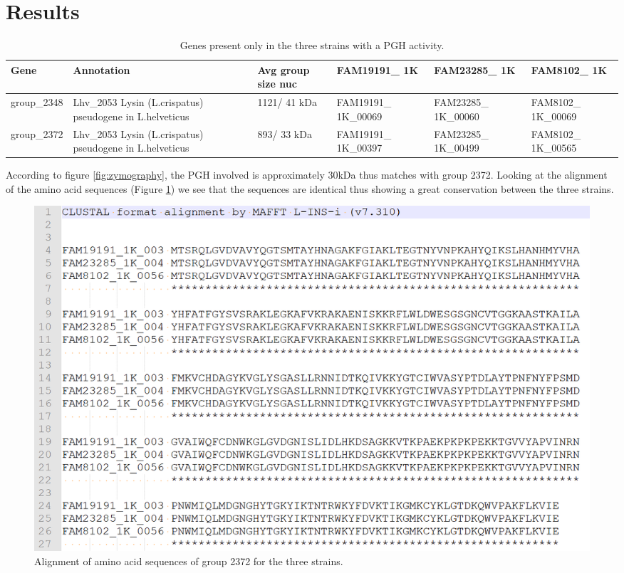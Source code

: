 \documentclass[10pt,a4paper]{article}
\begin{document}
\section*{Results}





\begin{table}[htbp]
	\centering
	\begin{tabularx}{\linewidth}{|X|X|X|X|X|X|}
		\hline
		\textbf{Gene} & \textbf{Annotation} & \textbf{Avg group size nuc} & \textbf{FAM19191\_ 1K} & \textbf{FAM23285\_ 1K} & \textbf{FAM8102\_ 1K}\\
		 \hline
		group\_2348 & Lhv\_2053 Lysin (L.crispatus) pseudogene in L.helveticus & 1121/ 41 kDa & FAM19191\_ 1K\_00069 & FAM23285\_ 1K\_00060 & FAM8102\_ 1K\_00069 \\
		\hline
		group\_2372 & Lhv\_2053 Lysin (L.crispatus) pseudogene in L.helveticus & 893/ 33 kDa & FAM19191\_ 1K\_00397 & FAM23285\_ 1K\_00499 & FAM8102\_ 1K\_00565 \\
		\hline	
	\end{tabularx}
	\caption{Genes present only in the three strains with a PGH activity.}
	\label{tab:resultPGHexpr}
\end{table}

\noindent According to figure \ref{fig:zymography}, the PGH involved is approximately 30kDa thus matches with group 2372. Looking at the alignment of the amino acid sequences (Figure \ref{fig:alignmentgrp2372}) we see that the sequences are identical thus showing a great conservation between the three strains. \\




\begin{figure}
	\centering
	\includegraphics[width=0.7\linewidth]{img/AlignmentGrp2372}
	\caption{Alignment of amino acid sequences of group 2372 for the three strains.}
	\label{fig:alignmentgrp2372}
\end{figure}
\end{document}
